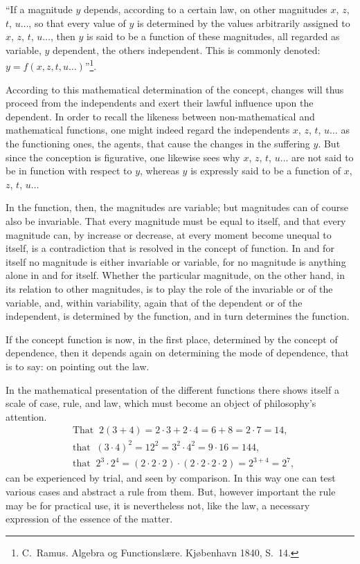 \documentclass[12pt]{book}
\begin{document}
``If a magnitude $y$ depends, according to a certain law, on other magnitudes
$x$, $z$, $t$, $u\ldots$, so that every value of $y$ is determined by the values
arbitrarily assigned to $x$, $z$, $t$, $u\ldots$, then $y$ is said to be a
function of these magnitudes, all regarded as variable, $y$ dependent, the
others independent. This is commonly denoted: $y = f(x,z,t,u\ldots)$''\footnote{C.\
Ramus. Algebra og Functionslære. Kjøbenhavn 1840, S.\ 14.}.

According to this mathematical determination of the concept, changes will thus
proceed from the independents and exert their lawful influence upon the
dependent. In order to recall the likeness between non-mathematical and
mathematical functions, one might indeed regard the independents $x$, $z$, $t$,
$u\ldots$ as the functioning ones, the agents, that cause the changes in the
suffering $y$. But since the conception is figurative, one likewise sees why
$x$, $z$, $t$, $u\ldots$ are not said to be in function with respect to $y$,
whereas $y$ is expressly said to be a function of $x$, $z$, $t$, $u\ldots$

In the function, then, the magnitudes are variable; but magnitudes can of course
also be invariable. That every magnitude must be equal to itself, and that every
magnitude can, by increase or decrease, at every moment become
unequal to itself, is a contradiction that is resolved in the concept of
function. In and for itself no magnitude is either invariable or variable, for
no magnitude is anything alone in and for itself. Whether the particular
magnitude, on the other hand, in its relation to other magnitudes, is to play
the role of the invariable or of the variable, and, within variability, again
that of the dependent or of the independent, is determined by the function, and
in turn determines the function.

If the concept function is now, in the first place, determined by the concept of
dependence, then it depends again on determining the mode of dependence, that is
to say: on pointing out the law.

In the mathematical presentation of the different functions there shows itself a
scale of case, rule, and law, which must become an object of philosophy's
attention.
\[
\begin{aligned}
&\text{That }\ 2(3+4) = 2\cdot 3 + 2\cdot 4 = 6+8 = 2\cdot 7 = 14,\\
&\text{that }\ (3\cdot 4)^{2} = 12^{2} = 3^{2}\cdot 4^{2} = 9\cdot 16 = 144,\\
&\text{that }\ 2^{3}\cdot 2^{4} = (2\cdot 2\cdot 2)\cdot(2\cdot 2\cdot 2\cdot 2)
      = 2^{3+4} = 2^{7},
\end{aligned}
\]
can be experienced by trial, and seen by comparison. In this way one can test
various cases and abstract a rule from them. But, however important the rule may
be for practical use, it is nevertheless not, like the law, a necessary
expression of the essence of the matter.
\end{document}
